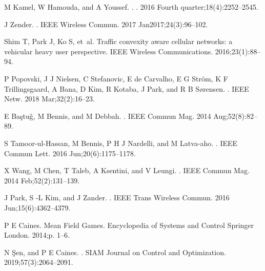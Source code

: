 \documentclass{book}
\begin{document}
\begin{thebibliography}{10}

  {M  Kamel, W  Hamouda, and A  Youssef}.
  .
  . 2016 Fourth quarter;18(4):2252--2545.
  
  {J  Zender}.
  .
  \newblock IEEE Wireless Commun. 2017 Jan2017;24(3):96--102.
  
  {Shim} T, {Park} J, {Ko} S, et~al.
  \newblock Traffic convexity aware cellular networks: a vehicular heavy user
    perspective.
  \newblock IEEE Wireless Communications. 2016;23(1):88--94.
  
  {P  Popovski, J  J  Nielsen, C  Stefanovic, E  de Carvalho, E  G  Str\"{o}m, K
    F  Trillingsgaard, A  Bana, D  Kim, R  Kotaba, J  Park, and R  B
    S\o{}rensen}.
  .
  \newblock IEEE Netw. 2018 Mar;32(2):16--23.
  
  {E  Ba\c{s}tu\v{g}, M  Bennis, and M  Debbah}.
  .
  \newblock IEEE Commun Mag. 2014 Aug;52(8):82--89.
  
  {S  Tamoor-ul-Hassan, M  Bennis, P  H  J  Nardelli, and M  Latva-aho}.
  .
  \newblock IEEE Commun Lett. 2016 Jun;20(6):1175--1178.
  
  {X  Wang, M  Chen, T  Taleb, A  Ksentini, and V  Leungi}.
  .
  \newblock IEEE Commun Mag. 2014 Feb;52(2):131--139.
  
  {J  Park, S -L  Kim, and J  Zander}.
  .
  \newblock IEEE Trans Wireless Commun. 2016 Jun;15(6):4362--4379.
  
  {P  E  Caines}.
  \newblock Mean Field Games.
  \newblock Encyclopedia of Systems and Control Springer London. 2014;p. 1--6.
  
  {N  \c{S}en, and P  E  Caines}.
  .
  \newblock SIAM Journal on Control and Optimization. 2019;57(3):2064--2091.
  

\end{thebibliography}
\end{document}
